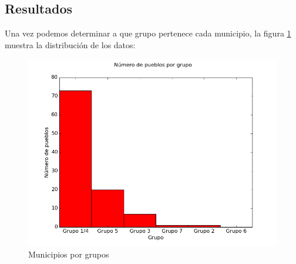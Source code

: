\subsection{Resultados}

Una vez podemos determinar a que grupo pertenece cada municipio, la figura \ref{fig:grupos} muestra la distribución de los datos:

\begin{figure}[h]
\centering
\includegraphics[scale=0.65]{trabajo_previo/histograma.png}
\caption{Municipios por grupos}
\label{fig:grupos}
\end{figure}
